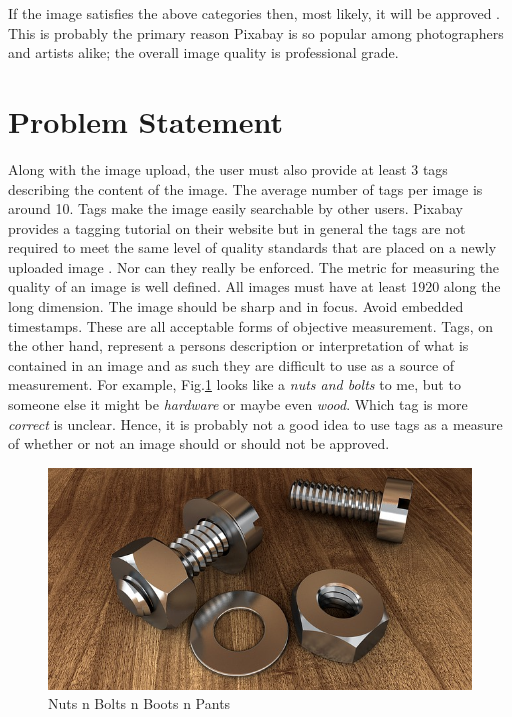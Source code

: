 \documentclass[10pt, a4paper, twocolumn]{article} %
\begin{document}
If the image satisfies the above categories then, most likely, it will be approved \citep{Pixabay:Tagging}.  This is probably the primary reason Pixabay is so popular among photographers and artists alike; the overall image quality is professional grade.


\section{Problem Statement} %

Along with the image upload, the user must also provide at least 3 tags describing the content of the image.  The average number of tags per image is around 10.  Tags make the image easily searchable by other users.  Pixabay provides a tagging tutorial on their website but in general the tags are not required to meet the same level of quality standards that are placed on a newly uploaded image \citep{Pixabay:ImgStandards}. Nor can they really be enforced.  The metric for measuring the quality of an image is well defined.  All images must have at least 1920 along the long dimension.  The image should be sharp and in focus.  Avoid embedded timestamps.  These are all acceptable forms of objective measurement.  Tags, on the other hand, represent a persons description or interpretation of what is contained in an image and as such they are difficult to use as a source of measurement.  For example, Fig.\ref{screw-1924174_640} looks like a \textit{nuts and bolts} to me, but to someone else it might be \textit{hardware} or maybe even \textit{wood}.  Which tag is more \textit{correct} is unclear.  Hence, it is probably not a good idea to use tags as a measure of whether or not an image should or should not be approved. 

\begin{figure}
	\includegraphics[width=\linewidth]{screw-1924174_640.jpg} %
	\caption{Nuts n Bolts n Boots n Pants} %
	\label{screw-1924174_640} %
\end{figure}
\end{document}
